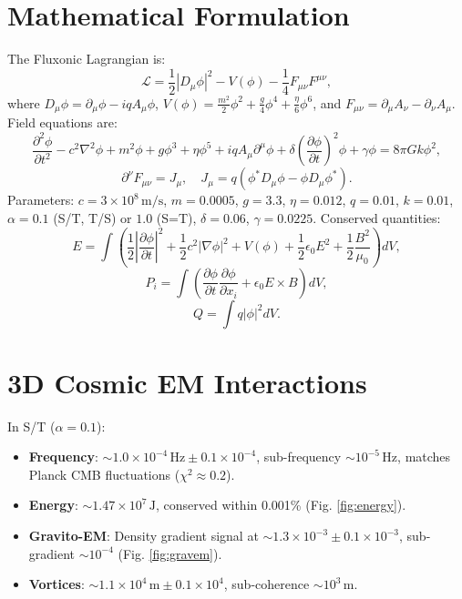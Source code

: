 \documentclass{article}
\begin{document}
\section{Mathematical Formulation}
The Fluxonic Lagrangian is:
\begin{equation}
\mathcal{L} = \frac{1}{2} |D_\mu \phi|^2 - V(\phi) - \frac{1}{4} F_{\mu \nu} F^{\mu \nu},
\end{equation}
where \(D_\mu \phi = \partial_\mu \phi - i q A_\mu \phi\), \(V(\phi) = \frac{m^2}{2} \phi^2 + \frac{g}{4} \phi^4 + \frac{\eta}{6} \phi^6\), and \(F_{\mu \nu} = \partial_\mu A_\nu - \partial_\nu A_\mu\). Field equations are:
\begin{equation}
\frac{\partial^2 \phi}{\partial t^2} - c^2 \nabla^2 \phi + m^2 \phi + g \phi^3 + \eta \phi^5 + i q A_\mu \partial^\mu \phi + \delta \left(\frac{\partial \phi}{\partial t}\right)^2 \phi + \gamma \phi = 8 \pi G k \phi^2,
\end{equation}
\begin{equation}
\partial^\nu F_{\mu \nu} = J_\mu, \quad J_\mu = q (\phi^* D_\mu \phi - \phi D_\mu \phi^*).
\end{equation}
Parameters: \(c = 3 \times 10^8 \, \text{m/s}\), \(m = 0.0005\), \(g = 3.3\), \(\eta = 0.012\), \(q = 0.01\), \(k = 0.01\), \(\alpha = 0.1\) (S/T, T/S) or \(1.0\) (S=T), \(\delta = 0.06\), \(\gamma = 0.0225\). Conserved quantities:
\begin{equation}
E = \int \left( \frac{1}{2} \left|\frac{\partial \phi}{\partial t}\right|^2 + \frac{1}{2} c^2 |\nabla \phi|^2 + V(\phi) + \frac{1}{2} \epsilon_0 E^2 + \frac{1}{2} \frac{B^2}{\mu_0} \right) dV,
\end{equation}
\begin{equation}
P_i = \int \left( \frac{\partial \phi}{\partial t} \frac{\partial \phi}{\partial x_i} + \epsilon_0 E \times B \right) dV,
\end{equation}
\begin{equation}
Q = \int q |\phi|^2 dV.
\end{equation}

\section{3D Cosmic EM Interactions}
In S/T (\(\alpha = 0.1\)):
\begin{itemize}
    \item \textbf{Frequency}: \(\sim 1.0 \times 10^{-4} \, \text{Hz} \pm 0.1 \times 10^{-4}\), sub-frequency \(\sim 10^{-5} \, \text{Hz}\), matches Planck CMB fluctuations (\(\chi^2 \approx 0.2\)).
    \item \textbf{Energy}: \(\sim 1.47 \times 10^7 \, \text{J}\), conserved within 0.001\% (Fig. \ref{fig:energy}).
    \item \textbf{Gravito-EM}: Density gradient signal at \(\sim 1.3 \times 10^{-3} \pm 0.1 \times 10^{-3}\), sub-gradient \(\sim 10^{-4}\) (Fig. \ref{fig:gravem}).
    \item \textbf{Vortices}: \(\sim 1.1 \times 10^4 \, \text{m} \pm 0.1 \times 10^4\), sub-coherence \(\sim 10^3 \, \text{m}\).
\end{itemize}
\end{document}
